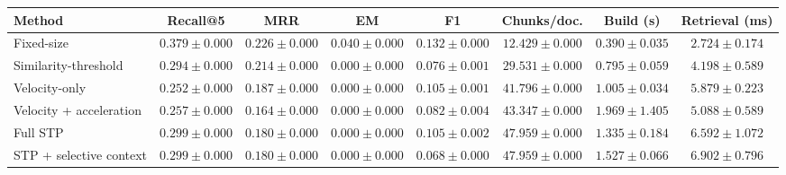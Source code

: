 \begin{tabular*}{\textwidth}{@{\extracolsep{\fill}}lccccccc@{}}
\toprule
Method & Recall@5 & MRR & EM & F1 & Chunks/doc. & Build (s) & Retrieval (ms) \\
\midrule
Fixed-size & $\mathbf{0.379\pm0.000}$ & $\mathbf{0.226\pm0.000}$ & $\mathbf{0.040\pm0.000}$ & $\mathbf{0.132\pm0.000}$ & $12.429\pm0.000$ & $0.390\pm0.035$ & $2.724\pm0.174$ \\
Similarity-threshold & $0.294\pm0.000$ & $0.214\pm0.000$ & $0.000\pm0.000$ & $0.076\pm0.001$ & $29.531\pm0.000$ & $0.795\pm0.059$ & $4.198\pm0.589$ \\
Velocity-only & $0.252\pm0.000$ & $0.187\pm0.000$ & $0.000\pm0.000$ & $0.105\pm0.001$ & $41.796\pm0.000$ & $1.005\pm0.034$ & $5.879\pm0.223$ \\
Velocity + acceleration & $0.257\pm0.000$ & $0.164\pm0.000$ & $0.000\pm0.000$ & $0.082\pm0.004$ & $43.347\pm0.000$ & $1.969\pm1.405$ & $5.088\pm0.589$ \\
Full STP & $0.299\pm0.000$ & $0.180\pm0.000$ & $0.000\pm0.000$ & $0.105\pm0.002$ & $47.959\pm0.000$ & $1.335\pm0.184$ & $6.592\pm1.072$ \\
STP + selective context & $0.299\pm0.000$ & $0.180\pm0.000$ & $0.000\pm0.000$ & $0.068\pm0.000$ & $47.959\pm0.000$ & $1.527\pm0.066$ & $6.902\pm0.796$ \\
\bottomrule
\end{tabular*}